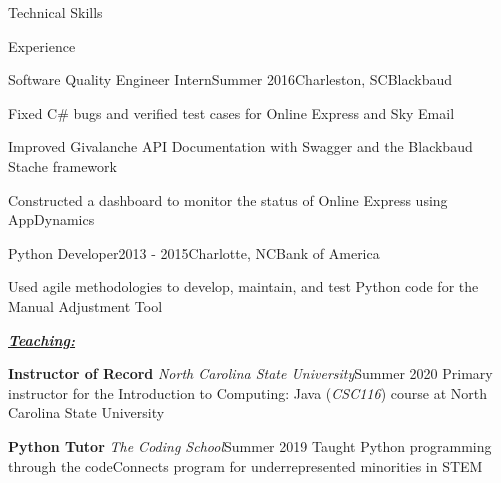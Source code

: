 \documentclass{resume} %
\begin{document}
\begin{rSection}{Technical Skills}
\begin{rSection}{Experience}
\begin{pSubsection}{\small Software Quality Engineer Intern}{\small Summer 2016}{\small Charleston, SC}{\small Blackbaud}
    \item {\small Fixed C\# bugs and verified test cases for Online Express and Sky Email}
    \item {\small Improved Givalanche API Documentation with Swagger and the Blackbaud Stache framework}
    \item {\small Constructed a dashboard to monitor the status of Online Express using AppDynamics}
\end{pSubsection}
\vspace{-10pt}

\begin{pSubsection}{\small Python Developer}{\small 2013 - 2015}{\small Charlotte, NC}{\small Bank of America}
\item {\small Used agile methodologies to develop, maintain, and test Python code for the Manual Adjustment Tool}
\end{pSubsection}
\vspace{-8pt}

\underline{\textbf{\textit{Teaching:}}}
\vspace{-7pt}

\begin{eSubsection}{\small \textbf{Instructor of Record} \textit{North Carolina State University}}{\small Summer 2020}
{\small Primary instructor for the Introduction to Computing: Java (\textit{CSC116}) course at North Carolina State University}
\end{eSubsection}
\vspace{-8pt}


\begin{eSubsection}{\small \textbf{Python Tutor} \textit{The Coding School}}{\small Summer 2019}
{\small Taught Python programming through the codeConnects program for underrepresented minorities in STEM}
\end{eSubsection}
\vspace{-8pt}


\end{rSection}
\end{rSection}
\end{document}
